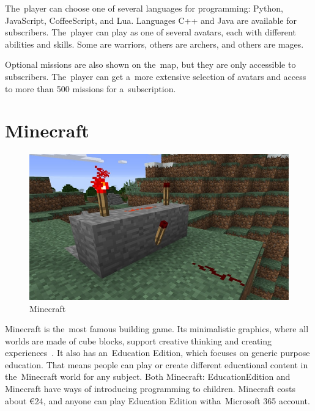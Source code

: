 The~player can choose one of several languages for programming: Python, JavaScript, CoffeeScript, and Lua.
Languages C++ and Java are available for subscribers.
The~player can play as one of several avatars, each with different abilities and skills.
Some are warriors, others are archers, and others are mages.

Optional missions are also shown on the~map, but they are only accessible to subscribers.
The~player can get a~more extensive selection of avatars and access to more than 500 missions for a~subscription.

\pagebreak
\section{Minecraft}
\label{similar-games:minecraft}

\begin{figure}
    \centering
    \includegraphics[width=1\linewidth]{assets/similar-games/minecraft.jpg}
    \caption{Minecraft~\cite{a2022_minecraft}}
    \label{fig:minecraft}
\end{figure}

Minecraft is the~most famous building game.
Its minimalistic graphics, where all worlds are made of cube blocks, support creative thinking and creating experiences~\cite{a2022_minecraft}.
It also has an~Education Edition, which focuses on generic purpose education.
That means people can play or create different educational content in the~Minecraft world for any subject.
Both Minecraft: Education\linebreak{}Edition and Minecraft have ways of introducing programming to children.
\linebreak
Minecraft costs about €24, and anyone can play Education Edition with\linebreak{}a~Microsoft 365 account.

